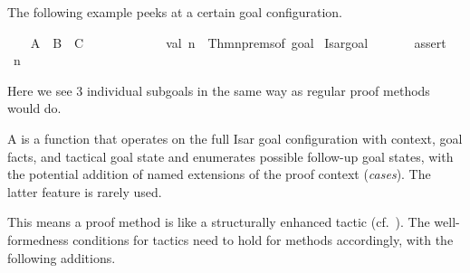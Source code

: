 \begin{isabellebody}
\begin{isamarkuptext}
\begin{description}
  \end{description}%
\end{isamarkuptext}%
\isamarkuptrue%
%
\endisatagmlantiq
{\isafoldmlantiq}%
%
\isadelimmlantiq
%
\endisadelimmlantiq
%
\isadelimmlex
%
\endisadelimmlex
%
\isatagmlex
%
\begin{isamarkuptext}%
The following example peeks at a certain goal configuration.%
\end{isamarkuptext}%
\isamarkuptrue%
%
\endisatagmlex
{\isafoldmlex}%
%
\isadelimmlex
%
\endisadelimmlex
{}\isamarkupfalse%
\isanewline
%
\isadelimproof
\ \ %
\endisadelimproof
%
\isatagproof
{}\isamarkupfalse%
\ A\ \ B\ \ C%
\endisatagproof
{\isafoldproof}%
%
\isadelimproof
\isanewline
%
\endisadelimproof
%
\isadelimML
\ \ \ \ %
\endisadelimML
%
\isatagML
{}\isamarkupfalse%
\ {\isacharverbatimopen}\isanewline
\ \ \ \ \ \ val\ n\ {\isacharequal}\ Thm{\isachardot}nprems{\isacharunderscore}of\ {\isacharparenleft}{\isacharhash}goal\ %
\isaantiq
Isar{\isachardot}goal%
\endisaantiq
{\isacharparenright}{\isacharsemicolon}\isanewline
\ \ \ \ \ \ %
\isaantiq
assert%
\endisaantiq
\ {\isacharparenleft}n\ {\isacharequal}\ {}{\isacharparenright}{\isacharsemicolon}\isanewline
\ \ \ \ {\isacharverbatimclose}%
\endisatagML
{\isafoldML}%
%
\isadelimML
\isanewline
%
\endisadelimML
%
\isadelimproof
\ \ \ \ %
\endisadelimproof
%
\isatagproof
{}\isamarkupfalse%
%
\endisatagproof
{\isafoldproof}%
%
\isadelimproof
%
\endisadelimproof
%
\begin{isamarkuptext}%
Here we see 3 individual subgoals in the same way as regular
  proof methods would do.%
\end{isamarkuptext}%
\isamarkuptrue%
%
\isamarkuptrue%
%
\begin{isamarkuptext}%
A  is a function  that operates on the full Isar goal
  configuration with context, goal facts, and tactical goal state and
  enumerates possible follow-up goal states, with the potential
  addition of named extensions of the proof context (\emph{cases}).
  The latter feature is rarely used.

  This means a proof method is like a structurally enhanced tactic
  (cf.\ ).  The well-formedness conditions for
  tactics need to hold for methods accordingly, with the following
  additions.


\end{isamarkuptext}
\end{isabellebody}
